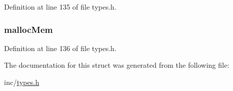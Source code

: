 Definition at line 135 of file types.h.

\hypertarget{structheap_status_a563eaaea14f23514bd4a6c87f11711dd}{
\subsubsection[{mallocMem}]{ {\bf mallocMem}}}
\label{structheap_status_a563eaaea14f23514bd4a6c87f11711dd}


Definition at line 136 of file types.h.



The documentation for this struct was generated from the following file:\begin{DoxyCompactItemize}
\item 
inc/\hyperlink{types_8h}{types.h}\end{DoxyCompactItemize}
